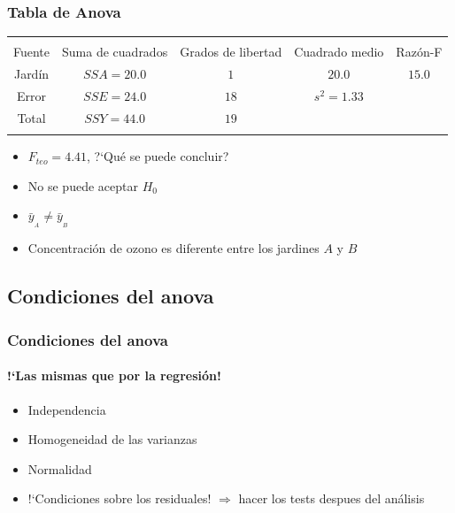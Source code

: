 \documentclass[mathserif]{beamer}
\begin{document}
\begin{frame}[label=anov16]
   \frametitle{Tabla de Anova}
   \small
   \renewcommand{\arraystretch}{1.3}
   \begin{table}
      \begin{tabular}{ccccc}
         \firsthline
         \\[-2ex]
         \parbox[c]{9ex}{\centering Fuente} & \parbox[c]{10ex}{\centering Suma de cuadrados} & \parbox[c]{10ex}{\centering Grados de libertad} & \parbox[c]{9ex}{\centering Cuadrado medio} & \parbox[c]{9ex}{\centering Raz\'on-F} \\[2ex]
         \hline
         Jard\'in & $SSA=20.0$ & $1 $ & $20.0$         & $15.0$ \\
         Error    & $SSE=24.0$ & $18$ & $s^2=1.33$ &      \\
         Total    & $SSY=44.0$ & $19$ &              &      \\
         \lasthline
      \end{tabular}
   \end{table}

   \begin{itemize}[<2-| visible@+(1)-| handout:1>]
      \item $F_{teo}=4.41$, ?`Qu\'e se puede concluir?
      \item No se puede aceptar $H_0$
      \item $\bar{y}_{_A}\neq\bar{y}_{_B}$
      \item Concentraci\'on de ozono es diferente entre los jardines $A$ y $B$
   \end{itemize}
\end{frame}%


\subsection[Condiciones]{Condiciones del anova}

\begin{frame}[label=anovcond]
   \frametitle{Condiciones del anova}
   \framesubtitle{!`Las mismas que por la regresi\'on!}
    \begin{itemize}
      \item Independencia
      \item Homogeneidad de las varianzas
      \item Normalidad
      \medskip
      \item[] !`Condiciones sobre los residuales! $\Rightarrow$ hacer los tests despues del an\'alisis
   \end{itemize}
\end{frame}%
\end{document}
